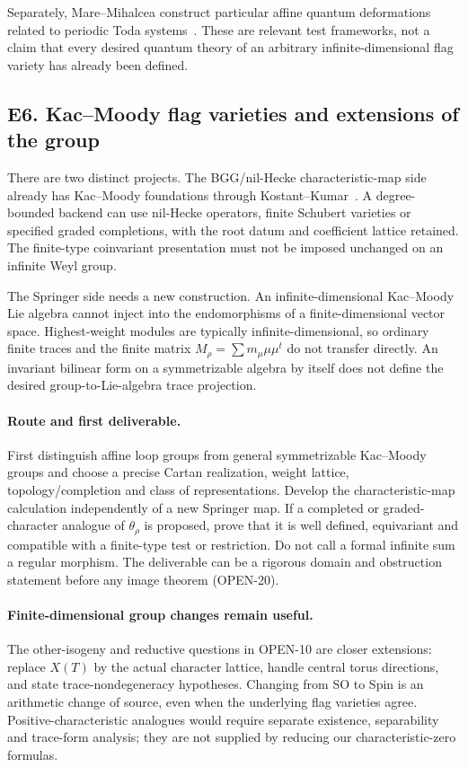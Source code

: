 \documentclass[11pt,letterpaper]{article}
\begin{document}
Separately, Mare--Mihalcea construct particular affine quantum deformations
related to periodic Toda systems~\cite{MM}. These are relevant test
frameworks, not a claim that every desired quantum theory of an arbitrary
infinite-dimensional flag variety has already been defined.

\newpage
\subsection*{E6. Kac--Moody flag varieties and extensions of the group}
There are two distinct projects. The BGG/nil-Hecke characteristic-map
side already has Kac--Moody foundations through Kostant--Kumar~\cite{KK}.
A degree-bounded backend can use nil-Hecke operators, finite Schubert
varieties or specified graded completions, with the root datum and
coefficient lattice retained. The finite-type coinvariant presentation
must not be imposed unchanged on an infinite Weyl group.

The Springer side needs a new construction. An infinite-dimensional
Kac--Moody Lie algebra cannot inject into the endomorphisms of a
finite-dimensional vector space. Highest-weight modules are typically
infinite-dimensional, so ordinary finite traces and the finite matrix
\(M_\rho=\sum m_\mu\mu\mu^t\) do not transfer directly.
An invariant bilinear form on a symmetrizable algebra by itself does
not define the desired group-to-Lie-algebra trace projection.

\paragraph{Route and first deliverable.}
First distinguish affine loop groups from general symmetrizable
Kac--Moody groups and choose a precise Cartan realization, weight lattice,
topology/completion and class of representations. Develop the
characteristic-map calculation independently of a new Springer map.
If a completed or graded-character analogue of \(\theta_\rho\) is proposed,
prove that it is well defined, equivariant and compatible with a
finite-type test or restriction. Do not call a formal infinite sum a
regular morphism. The deliverable can be a rigorous domain and
obstruction statement before any image theorem (OPEN-20).

\paragraph{Finite-dimensional group changes remain useful.}
The other-isogeny and reductive questions in OPEN-10 are closer extensions:
replace \(X(T)\) by the actual character lattice, handle central torus
directions, and state trace-nondegeneracy hypotheses.
Changing from SO to Spin is an arithmetic change of source, even when
the underlying flag varieties agree. Positive-characteristic analogues
would require separate existence, separability and trace-form analysis;
they are not supplied by reducing our characteristic-zero formulas.
\end{document}
